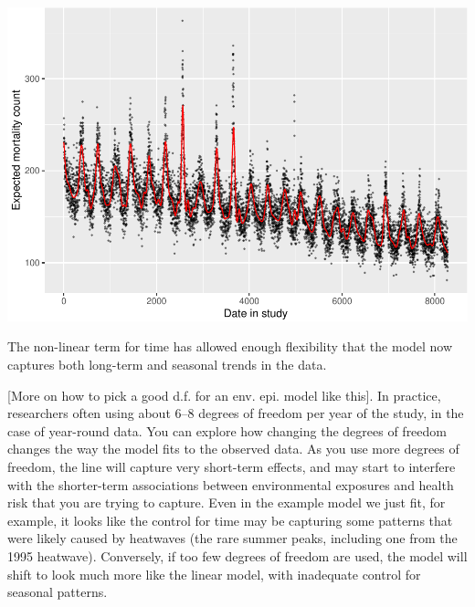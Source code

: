 \documentclass[
]{book}
\newenvironment{Shaded}{\begin{snugshade}}{\end{snugshade}}
\newcommand{\AttributeTok}[1]{\textcolor[rgb]{0.77,0.63,0.00}{#1}}
\newcommand{\FloatTok}[1]{\textcolor[rgb]{0.00,0.00,0.81}{#1}}
\newcommand{\FunctionTok}[1]{\textcolor[rgb]{0.00,0.00,0.00}{#1}}
\newcommand{\NormalTok}[1]{#1}
\newcommand{\SpecialCharTok}[1]{\textcolor[rgb]{0.00,0.00,0.00}{#1}}
\newcommand{\StringTok}[1]{\textcolor[rgb]{0.31,0.60,0.02}{#1}}
\begin{document}
\begin{Shaded}
\end{Shaded}

\includegraphics{adv_epi_analysis_files/figure-latex/unnamed-chunk-51-1.pdf}

The non-linear term for time has allowed enough flexibility that the model now
captures both long-term and seasonal trends in the data.

{[}More on how to pick a good d.f. for an env. epi. model like this{]}. In practice,
researchers often using about 6--8 degrees of freedom per year of the study, in
the case of year-round data. You can explore how changing the degrees of freedom
changes the way the model fits to the observed data. As you use more degrees of
freedom, the line will capture very short-term effects, and may start to
interfere with the shorter-term associations between environmental exposures and
health risk that you are trying to capture. Even in the example model we just
fit, for example, it looks like the control for time may be capturing some
patterns that were likely caused by heatwaves (the rare summer peaks, including
one from the 1995 heatwave). Conversely, if too few degrees of freedom are used,
the model will shift to look much more like the linear model, with inadequate
control for seasonal patterns.
\end{document}
